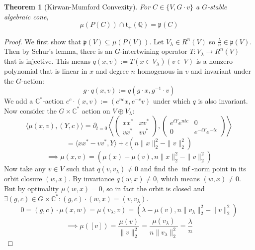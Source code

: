 \documentclass{article}
\newtheorem{theorem}{Theorem}
\newcommand{\C}{{\mathbb{C}}}
\newcommand{\Q}{{\mathbb{Q}}}
\begin{document}
\begin{theorem} [Kirwan-Mumford Convexity]
For $C \in \{V, G \cdot v\}$ a $G$-stable algebraic cone, 
\[ \mu(P(C)) \cap \mathfrak{t}_{+}(\Q) = \mathfrak{p}(C)  \]
\end{theorem}
\begin{proof}
We first show that $\mathfrak{p}(V) \subseteq \mu(P(V))$. Let $V_{\lambda} \in R^{n}(V)$ so $\frac{\lambda}{n} \in \mathfrak{p}(V)$. Then by Schur's lemma, there is an $G$-intertwining operator $T : V_{\lambda} \to R^{n}(V)$ that is injective. This means $q(x,v) := T(x \in V_{\lambda})(v \in V)$ is a nonzero polynomial that is linear in $x$ and degree $n$ homogenous in $v$ and invariant under the $G$-action:
\[ g \cdot q(x,v) := q(g \cdot x, g^{-1} \cdot v) \]
We add a $\C^{*}$-action $e^{c} \cdot (x,v) := (e^{nc} x, e^{-c} v)$ under which $q$ is also invariant. Now consider the $G \times \C^{*}$ action on $V \oplus V_{\lambda}$:
\[ \langle \mu(x,v), (Y,c) \rangle = \partial_{t=0} 
\left\langle 
\begin{pmatrix} x x^{*} & x v^{*}
\\              v x^{*} & v v^{*}
\end{pmatrix},
\begin{pmatrix} e^{t Y} e^{ntc} & 0
\\              0        & e^{-t Y} e^{-t c}
\end{pmatrix}
\right\rangle \]
\[ = \langle x x^{*} - v v^{*}, Y \rangle + c(n \|x\|_{2}^{2} - \|v\|_{2}^{2}) \] \[ \implies \mu(x,v) = (\mu(x) - \mu(v), n \|x\|_{2}^{2} - \|v\|_{2}^{2})  \]
Now take any $v \in V$ such that $q(v,v_{\lambda}) \neq 0$ and find the $\inf$-norm point in its orbit closure $(w,x)$. By invariance $q(w,x) \neq 0$, which means $(w,x) \neq 0$. But by optimality $\mu(w,x) = 0$, so in fact the orbit is closed and $\exists (g,c) \in G \times \C^{*}: (g,c) \cdot (w,x) = (v,v_{\lambda})$. 
\[ 0 = (g,c) \cdot \mu(x,w) = \mu(v_{\lambda},v) = (\lambda - \mu(v), n \|v_{\lambda}\|_{2}^{2} - \|v\|_{2}^{2})   \]
\[ \implies \mu([v]) = \frac{\mu(v)}{\|v\|_{2}^{2}} = \frac{\mu(v_{\lambda})}{n \|v_{\lambda}\|_{2}^{2}} = \frac{\lambda}{n} \]


\end{proof}
\end{document}
